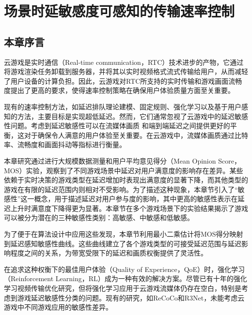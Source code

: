 
\chapter{场景时延敏感度可感知的传输速率控制}
\section{本章序言}
云游戏是实时通信（Real-time communication，RTC）技术进步的产物，它通过将游戏渲染任务卸载到服务器，并将其以实时视频格式流式传输给用户，从而减轻了用户设备的计算负担。因此，云游戏对RTC所支持的实时传输和游戏画面流畅度提出了更高的要求，使得速率控制策略在确保用户体验质量方面至关重要。

现有的速率控制方法，如延迟排队理论建模\cite{arun2018copa,raeis2021queue}、固定规则\cite{ray2022sqp,carlucci2016analysis}、强化学习\cite{abbasloo2020classic,jay2019deep}以及基于用户感知的方法\cite{peng2023pacc,huang2023optimizing}，主要目标是实现超低延迟。然而，它们通常忽视了云游戏中的延迟敏感性问题\cite{claypool2006latency,claypool2010latency}。考虑到延迟敏感性可以在流媒体画质\cite{shang2021study} 和端到端延迟之间提供更好的平衡，这对于确保令人满意的用户体验至关重要。在云游戏中，流媒体画质通过比特率、流畅度和画面抖动等指标进行衡量。

本章研究通过进行大规模数据测量和用户平均意见得分（Mean Opinion Score，MOS）实验，观察到了不同游戏场景中延迟对用户满意度的影响存在差异。某些依赖于实时决策的游戏类型在延迟增加时表现出满意度的显著下降，而其他类型的游戏在有限的延迟范围内则相对不受影响。为了描述这种现象，本章节引入了“敏感性”这一概念，用于描述延迟对用户参与度的影响，其中更高的敏感性表示在延迟上升时满意度下降得更为显著。本章节在多个游戏场景下的实验结果揭示了游戏可以被分为潜在的三种敏感性类别：高敏感、中敏感和低敏感。

为了便于在算法设计中应用这些发现，本章节利用最小二乘估计将MOS得分映射到延迟感知敏感性曲线。这些曲线建立了各个游戏类型的可接受延迟范围与延迟影响程度之间的关系，为带宽受限下的延迟和画质权衡提供了灵活性。

在追求这种权衡下的最佳用户体验（Quality of Experience，QoE）时，强化学习（Reinforcement Learning，RL）成为一种有效的解决方案。尽管已有十年的强化学习视频传输优化研究\cite{dao2022contemporary}，但将强化学习应用于云游戏流媒体仍存在空白，特别是考虑到游戏延迟敏感性分类的问题。现有的研究，如ReCoCo\cite{markudova2023recoco}和R3Net\cite{fang2019reinforcement}，未能考虑云游戏中不同游戏应用的敏感性差异。

